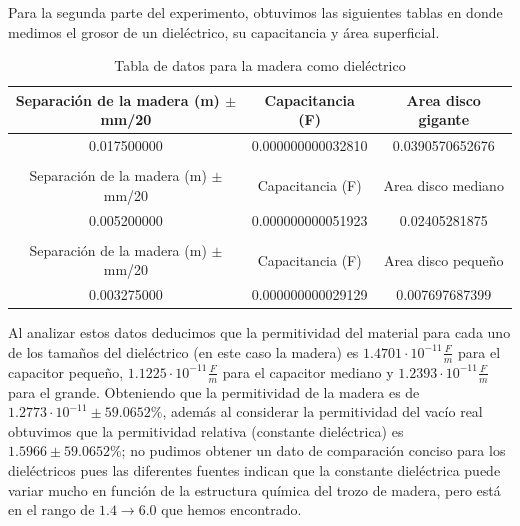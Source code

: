\documentclass[article,12pt]{elsarticle}
\begin{document}
Para la segunda parte del experimento, obtuvimos las siguientes tablas en donde medimos el grosor de un dieléctrico, su capacitancia y área superficial.

\begin{table}[H]
\centering
\begin{tabular}{ccc}
\hline
\multicolumn{1}{|c|}{Separación de la madera (m) $\pm$ mm/20} & \multicolumn{1}{c|}{Capacitancia (F)}  & \multicolumn{1}{c|}{Area disco gigante} \\ \hline
\multicolumn{1}{|c|}{0.017500000}                              & \multicolumn{1}{c|}{0.000000000032810} & \multicolumn{1}{c|}{0.0390570652676}    \\ \hline
                                                               &                                        &                                         \\ \hline
\multicolumn{1}{|c|}{Separación de la madera (m) $\pm$ mm/20} & \multicolumn{1}{c|}{Capacitancia (F)}  & \multicolumn{1}{c|}{Area disco mediano} \\ \hline
\multicolumn{1}{|c|}{0.005200000}                              & \multicolumn{1}{c|}{0.000000000051923} & \multicolumn{1}{c|}{0.02405281875}      \\ \hline
                                                               &                                        &                                         \\ \hline
\multicolumn{1}{|c|}{Separación de la madera (m) $\pm$ mm/20} & \multicolumn{1}{c|}{Capacitancia (F)}  & \multicolumn{1}{c|}{Area disco pequeño} \\ \hline
\multicolumn{1}{|c|}{0.003275000}                              & \multicolumn{1}{c|}{0.000000000029129} & \multicolumn{1}{c|}{0.007697687399}     \\ \hline
\end{tabular}
\caption{Tabla de datos para la madera como dieléctrico}
\end{table}

Al analizar estos datos deducimos que la permitividad del material para cada uno de los tamaños del dieléctrico (en este caso la madera) es $1.4701 \cdot 10^{-11} \frac{F}{m}$ para el capacitor pequeño, $1.1225 \cdot 10^{-11} \frac{F}{m}$ para el capacitor mediano y $1.2393 \cdot 10^{-11}\frac{F}{m}$ para el grande. Obteniendo que la permitividad de la madera es de $1.2773 \cdot 10^{-11} \pm 59.0652\%$, además al considerar la permitividad del vacío real obtuvimos que la permitividad relativa (constante dieléctrica) es $1.5966 \pm 59.0652 \%$; no pudimos obtener un dato de comparación conciso para los dieléctricos pues las diferentes fuentes indican que la constante dieléctrica puede variar mucho en función de la estructura química del trozo de madera, pero está en el rango de $1.4\rightarrow 6.0$ que hemos encontrado.
\end{document}
